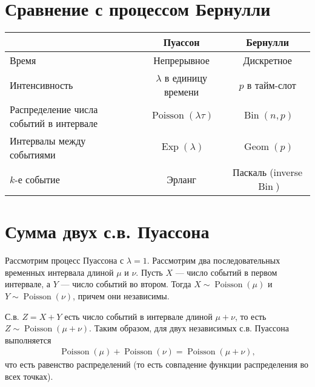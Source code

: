\documentclass[12pt]{article}
\DeclareMathOperator{\Bin}{Bin}
\DeclareMathOperator{\Geom}{Geom}
\DeclareMathOperator{\Pois}{Poisson}
\DeclareMathOperator{\Exp}{Exp}
\begin{document}
\section{Сравнение с процессом Бернулли}
\begin{center}
  \begin{tabular}{p{5cm}|c|c}
    & Пуассон & Бернулли \\\hline
    Время & Непрерывное & Дискретное \\
    Интенсивность & $\lambda$ в единицу времени & $p$ в тайм-слот \\
    Распределение числа событий в интервале & $\Pois(\lambda\tau)$ & $\Bin(n, p)$ \\
    Интервалы между событиями & $\Exp(\lambda)$ & $\Geom(p)$ \\
    $k$-е событие & Эрланг & Паскаль (inverse $\Bin$) \\
  \end{tabular}
\end{center}

\section{Сумма двух с.в. Пуассона}

Рассмотрим процесс Пуассона с $\lambda = 1$. Рассмотрим два последовательных временных интервала длиной $\mu$ и $\nu$. Пусть $X$ --- число событий в первом интервале, а $Y$ --- число событий во втором. Тогда $X \sim \Pois(\mu)$ и $Y \sim \Pois(\nu)$, причем они независимы.

С.в. $Z = X+Y$ есть число событий в интервале длиной $\mu + \nu$, то есть $Z \sim \Pois(\mu + \nu)$. Таким образом, для двух независимых с.в. Пуассона выполняется
\begin{align*}
  \Pois(\mu) + \Pois(\nu) = \Pois(\mu + \nu),
\end{align*}
что есть равенство распределений (то есть совпадение функции распределения во всех точках).
\end{document}
